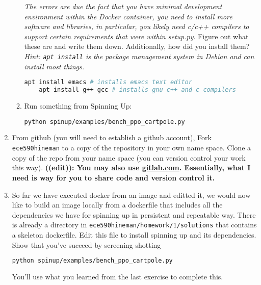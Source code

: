 \documentclass{article}
\begin{document}
\begin{enumerate}
\begin{enumerate}
  {\em The errors are due the fact that you have minimal development environment within the Docker container, you need to install more software and libraries,
    in particular, you likely need c/c++ compilers to support certain requirements that were within setup.py}. Figure out
  what these are and write them down. Additionally, how did you install them? {\em Hint: {\tt apt install} is the package management system in Debian and can install
    most things.}
  \begin{lstlisting}[language=bash]
    apt install emacs # installs emacs text editor
    apt install g++ gcc # installs gnu c++ and c compilers
  \end{lstlisting}
\item Run something from Spinning Up:
  \begin{lstlisting}[language=bash]
    python spinup/examples/bench_ppo_cartpole.py
  \end{lstlisting}
\end{enumerate}
\item
  From github (you will need to establish a github account), Fork {\tt
ece590hineman} to a copy of the repository in your own name space.
Clone a copy of the repo from your name space (you can version control your work
this way). {\bf ((edit)): You may also use \url{gitlab.com}. Essentially, what I need is way
  for you to share code and version control it.}
\item
  So far we have executed docker from an image and editted it, we would now like
to build an image locally from a dockerfile that includes all the dependencies
we have for spinning up in persistent and repeatable way. There is already a
directory in {\tt ece590hineman/homework/1/solutions} that contains a
skeleton dockerfile. Edit this file to install spinning up and its dependencies.
Show that you've succeed by screening shotting
\begin{lstlisting}[language=bash]
  python spinup/examples/bench_ppo_cartpole.py
\end{lstlisting}
You'll use what you learned from the last exercise to complete this.
\end{enumerate}
\end{document}
